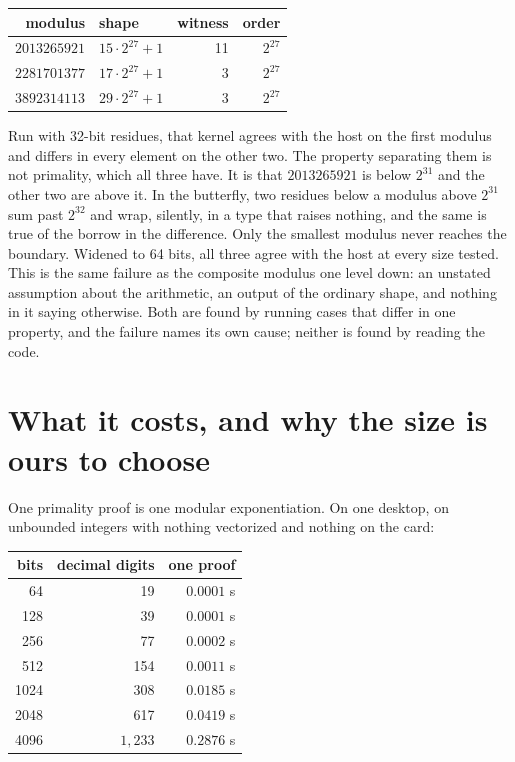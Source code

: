 \documentclass{article}
\begin{document}
\begin{center}
\begin{tabular}{@{}rlrr@{}}
\toprule
modulus & shape & witness & order \\
\midrule
\(2013265921\) & \(15 \cdot 2^{27} + 1\) & 11 & \(2^{27}\) \\
\(2281701377\) & \(17 \cdot 2^{27} + 1\) & 3 & \(2^{27}\) \\
\(3892314113\) & \(29 \cdot 2^{27} + 1\) & 3 & \(2^{27}\) \\
\bottomrule
\end{tabular}
\end{center}

Run with 32-bit residues, that kernel agrees with the host on the first modulus and differs in every element on the other two. The property separating them is not primality, which all three have. It is that \(2013265921\) is below \(2^{31}\) and the other two are above it. In the butterfly, two residues below a modulus above \(2^{31}\) sum past \(2^{32}\) and wrap, silently, in a type that raises nothing, and the same is true of the borrow in the difference. Only the smallest modulus never reaches the boundary. Widened to 64 bits, all three agree with the host at every size tested. This is the same failure as the composite modulus one level down: an unstated assumption about the arithmetic, an output of the ordinary shape, and nothing in it saying otherwise. Both are found by running cases that differ in one property, and the failure names its own cause; neither is found by reading the code.

\section{What it costs, and why the size is ours to choose}

One primality proof is one modular exponentiation. On one desktop, on unbounded integers with nothing vectorized and nothing on the card:

\begin{center}
\begin{tabular}{@{}rrr@{}}
\toprule
bits & decimal digits & one proof \\
\midrule
64 & 19 & \(0.0001\) s \\
128 & 39 & \(0.0001\) s \\
256 & 77 & \(0.0002\) s \\
512 & 154 & \(0.0011\) s \\
1024 & 308 & \(0.0185\) s \\
2048 & 617 & \(0.0419\) s \\
4096 & \(1{,}233\) & \(0.2876\) s \\
\bottomrule
\end{tabular}
\end{center}
\end{document}
